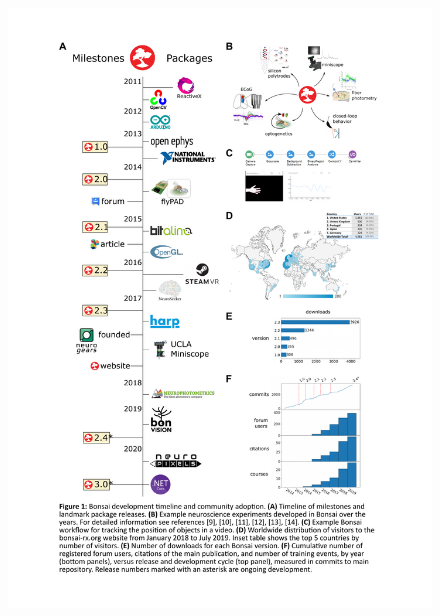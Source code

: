 \documentclass[a4paper,11point]{article}
\begin{document}
\begin{figure}
    \begin{center}
        \includegraphics[width=7in]{figures/bonsai.pdf}
        \label{fig:bonsai}
    \end{center}
\end{figure}

\setcounter{figure}{1}
\end{document}

